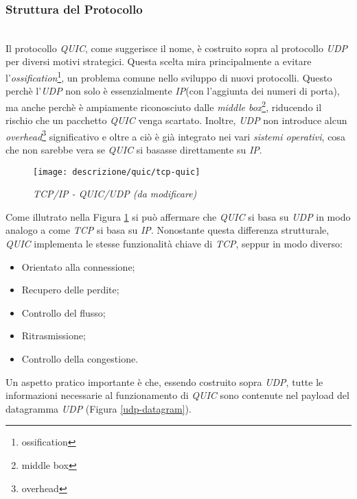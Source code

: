 \subsubsection{Struttura del Protocollo}
~\\ 
\indent Il protocollo \emph{QUIC}, come suggerisce il nome, è costruito sopra al protocollo \emph{UDP} per diversi motivi strategici. Questa scelta mira principalmente a evitare l'\emph{ossification}\footnote{\gls{ossification}}, un problema comune nello sviluppo di nuovi protocolli.
Questo perchè l'\emph{UDP} non solo è essenzialmente \emph{IP}(con l'aggiunta dei numeri di porta), ma anche perchè è ampiamente riconosciuto dalle \emph{middle box}\footnote{\gls{middle box}}, riducendo il rischio che un pacchetto \emph{QUIC} venga scartato.
Inoltre, \emph{UDP} non introduce alcun \emph{overhead}\footnote{\gls{overhead}} significativo e oltre a ciò è già integrato nei vari \emph{sistemi operativi}, cosa che non sarebbe vera se \emph{QUIC} si basasse direttamente su \emph{IP}.
\\
\begin{figure}[!h]
    \centering
    \texttt{[image: descrizione/quic/tcp-quic]}
    \caption{\emph{TCP/IP - QUIC/UDP (da modificare)}}
    \label{tcp-quic}
\end{figure}

\noindent Come illutrato nella Figura \ref{tcp-quic} si può affermare che \emph{QUIC} si basa su \emph{UDP} in modo analogo a come \emph{TCP} si basa su \emph{IP}.
Nonostante questa differenza strutturale, \emph{QUIC} implementa le stesse funzionalità chiave di \emph{TCP}, seppur in modo diverso:
\begin{itemize}
    \item Orientato alla connessione;
    \item Recupero delle perdite;
    \item Controllo del flusso;
    \item Ritrasmissione;
    \item Controllo della congestione.
\end{itemize}

\noindent Un aspetto pratico importante è che, essendo costruito sopra \emph{UDP}, tutte le informazioni necessarie al funzionamento di \emph{QUIC} sono contenute nel payload del datagramma \emph{UDP} (Figura \ref{udp-datagram}).
